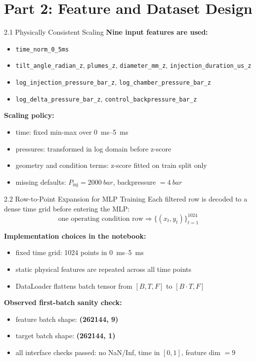 \documentclass[UTF8,aspectratio=169]{ctexbeamer}
\begin{document}
\section{Part 2: Feature and Dataset Design}

\begin{frame}{2.1 Physically Consistent Scaling}
\textbf{Nine input features are used:}
\begin{itemize}
  \item \texttt{time\_norm\_0\_5ms}
  \item \texttt{tilt\_angle\_radian\_z}, \texttt{plumes\_z}, \texttt{diameter\_mm\_z}, \texttt{injection\_duration\_us\_z}
  \item \texttt{log\_injection\_pressure\_bar\_z}, \texttt{log\_chamber\_pressure\_bar\_z}
  \item \texttt{log\_delta\_pressure\_bar\_z}, \texttt{control\_backpressure\_bar\_z}
\end{itemize}

\vspace{0.3em}
\textbf{Scaling policy:}
\begin{itemize}
  \item time: fixed min-max over \SIrange{0}{5}{ms}
  \item pressures: transformed in log domain before z-score
  \item geometry and condition terms: z-score fitted on train split only
  \item missing defaults: $P_{\text{inj}}=\SI{2000}{bar}$, backpressure $=\SI{4}{bar}$
\end{itemize}
\end{frame}

\begin{frame}{2.2 Row-to-Point Expansion for MLP Training}
Each filtered row is decoded to a dense time grid before entering the MLP:
\[
\text{one operating condition row}
\Rightarrow
\{(x_t, y_t)\}_{t=1}^{1024}
\]

\vspace{0.3em}
\textbf{Implementation choices in the notebook:}
\begin{itemize}
  \item fixed time grid: \num{1024} points in \SIrange{0}{5}{ms}
  \item static physical features are repeated across all time points
  \item DataLoader flattens batch tensor from $[B,T,F]$ to $[B\cdot T,F]$
\end{itemize}

\vspace{0.3em}
\textbf{Observed first-batch sanity check:}
\begin{itemize}
  \item feature batch shape: \textbf{(\num{262144}, 9)}
  \item target batch shape: \textbf{(\num{262144}, 1)}
  \item all interface checks passed: no NaN/Inf, time in $[0,1]$, feature dim $=9$
\end{itemize}
\end{frame}
\end{document}
